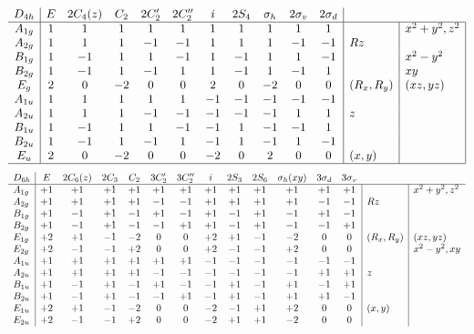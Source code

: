 \[
\begin{array}{c|cccccccccc|l|l|l}
D_{4h} & E & 2C_4 (z)& C_2& 2C'_2 &2C''_2 &i& 2S_4& \sigma_h &2\sigma_v&2\sigma_d & \multicolumn{1}{c} {\;} & \multicolumn{1}{c}{}  \\
\hline
A_{1g}&	1	&1	&1&	1&	1&	1&	1&	1	&1	&1& &x^2+y^2, z^2 \\
A_{2g}	&1&	1&	1&	-1&	-1&	1	&1	&1	&-1&	-1&	Rz&\\	
B_{1g}	&1	&-1&	1	&1	&-1&	1	&-1&	1&	1&	-1	& &	x^2-y^2\\
B_{2g}	&1	&-1&	1&	-1&	1&	1&	-1&	1&	-1&	1&		&xy\\
E_g&	2	&0	&-2&	0&	0&	2	&0	&-2&	0&	0&	(R_x, R_y)&(xz, yz)\\
A_{1u}&	1&	1&	1&	1&	1&	-1&	-1&	-1&	-1&	-1	&&	\\
A_{2u}&	1&	1&	1&	-1&	-1&	-1&	-1&	-1&	1&	1	&z&	\\
B_{1u}&	1&	-1&	1&	1&	-1&	-1&	1&	-1&	-1&	1	& &	\\
B_{2u}&	1&	-1&	1&	-1&	1&	-1&	1&	-1&	1&	-1	&  &	\\
E_u&	2&	0&	-2&	0&	0&	-2&	0&	2&	0&	0&	(x, y)&	\\
\hline
\end{array}
\]
\[
\begin{array}{l|cccccccccccc|l|l}
 D_{6h}  & E & \multicolumn{1}{c}{2C_6(z)} & 2C_3 & C_2 & 3C'_2  & 3C''_2
 &i  & 2S_3  & 2S_6  & \multicolumn{1}{c}{\sigma_{h} (xy)} &
3\sigma_{d}  & \multicolumn{1}{c}{3\sigma_{v}}   \\
\hline
 A_{1g} & +1  & +1  & +1  & +1  & +1  & +1  & +1  & +1  & +1  & +1  & +1  & +1   &  &x^2+y^2, z^2 \\
 A_{2g} & +1  & +1  & +1  & +1  & -1  & -1  & +1  & +1  & +1  & +1  & -1  & -1   &Rz  & \\
 B_{1g} & +1  & -1  & +1  & -1  & +1  & -1  & +1  & -1  & +1  & -1  & +1  & -1   &  &  \\
 B_{2g} & +1  & -1  & +1  & -1  & -1  & +1  & +1  & -1  & +1  & -1  & -1  & +1   &  &  \\
 E_{1g} & +2 & +1  & -1  & -2 & 0 & 0 & +2 & +1  & -1  & -2 & 0 & 0              &(R_x, R_y)&(xz, yz) \\
 E_{2g} & +2 & -1  & -1  & +2 & 0 & 0 & +2 & -1  & -1  & +2 & 0 & 0              &  & x^2-y^2, xy \\
 A_{1u} & +1  & +1  & +1  & +1  & +1  & +1  & -1  & -1  & -1  & -1  & -1  & -1   &  &  \\
 A_{2u} & +1  & +1  & +1  & +1  & -1  & -1  & -1  & -1  & -1  & -1  & +1  & +1   &z  & \\
 B_{1u} & +1  & -1  & +1  & -1  & +1  & -1  & -1  & +1  & -1  & +1  & -1  & +1   &  & \\
 B_{2u} & +1  & -1  & +1  & -1  & -1  & +1  & -1  & +1  & -1  & +1  & +1  & -1   &  & \\
 E_{1u} & +2 & +1  & -1  & -2 & 0 & 0 & -2 & -1  & +1  & +2 & 0 & 0              &(x,y)  &\\
 E_{2u}  & +2 & -1  & -1  & +2 & 0 & 0 & -2 & +1  & +1  & -2 & 0 & 0             &  & \\
\end{array}
\]

